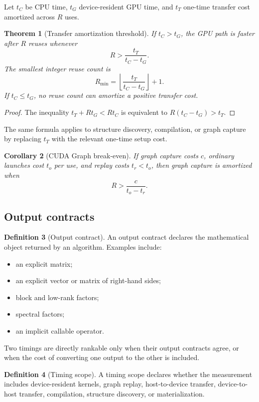 \documentclass[11pt]{article}
\newtheorem{theorem}{Theorem}[section]
\newtheorem{corollary}[theorem]{Corollary}
\theoremstyle{definition}
\newtheorem{definition}[theorem]{Definition}
\theoremstyle{remark}
\begin{document}
Let $t_C$ be CPU time, $t_G$ device-resident GPU time, and $t_T$ one-time transfer cost amortized across $R$ uses.

\begin{theorem}[Transfer amortization threshold]
If $t_C>t_G$, the GPU path is faster after $R$ reuses whenever
\[
\boxed{
R>\frac{t_T}{t_C-t_G}.
}
\]
The smallest integer reuse count is
\[
\boxed{
R_{\min}
 =\left\lfloor\frac{t_T}{t_C-t_G}\right\rfloor+1.
}
\]
If $t_C\le t_G$, no reuse count can amortize a positive transfer cost.
\end{theorem}

\begin{proof}
The inequality $t_T+Rt_G<Rt_C$ is equivalent to $R(t_C-t_G)>t_T$.
\end{proof}

The same formula applies to structure discovery, compilation, or graph capture by replacing $t_T$ with the relevant one-time setup cost.

\begin{corollary}[CUDA Graph break-even]
If graph capture costs $c$, ordinary launches cost $t_o$ per use, and replay costs $t_r<t_o$, then graph capture is amortized when
\[
R>\frac{c}{t_o-t_r}.
\]
\end{corollary}

\subsection{Output contracts}

\begin{definition}[Output contract]
An output contract declares the mathematical object returned by an algorithm. Examples include:
\begin{itemize}[leftmargin=1.4em]
\item an explicit matrix;
\item an explicit vector or matrix of right-hand sides;
\item block and low-rank factors;
\item spectral factors;
\item an implicit callable operator.
\end{itemize}
Two timings are directly rankable only when their output contracts agree, or when the cost of converting one output to the other is included.
\end{definition}

\begin{definition}[Timing scope]
A timing scope declares whether the measurement includes device-resident kernels, graph replay, host-to-device transfer, device-to-host transfer, compilation, structure discovery, or materialization.
\end{definition}
\end{document}

